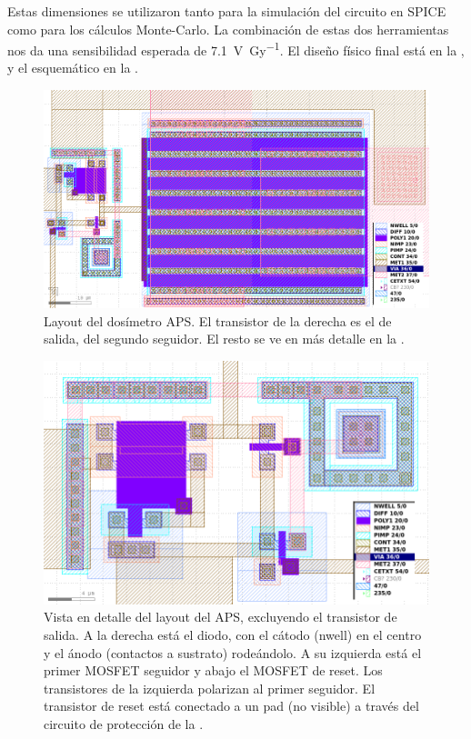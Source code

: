 Estas dimensiones se utilizaron tanto para la simulación del circuito en SPICE
como para los cálculos Monte-Carlo.
La combinación de estas dos herramientas nos da una sensibilidad esperada de 
\SI{7.1}{\volt\per\gray}.
El diseño físico final está en la ,
y el esquemático en la .
\begin{figure}[p]
    \centering
    \includegraphics[width=\columnwidth]{figuras/gds/aps/todo.png}
    \caption{Layout del dosímetro APS. 
    El transistor de la derecha es el de salida, del segundo seguidor.
    El resto se ve en más detalle en la .}
    \label{fig:layoutaps}
\end{figure}
\begin{figure}[p]
    \centering
    \includegraphics[width=\columnwidth]{figuras/gds/aps/zoom.png}
    \caption{Vista en detalle del layout del APS, excluyendo el transistor de
        salida.
        A la derecha está el diodo, con el cátodo (nwell) en el centro y el
        ánodo (contactos a sustrato) rodeándolo.
        A su izquierda está el primer MOSFET seguidor y abajo el MOSFET de
        reset.
        Los transistores de la izquierda polarizan al primer seguidor.
    El transistor de reset está conectado a un pad (no visible) a través del
    circuito de protección de la .}
    \label{fig:layoutapszoom}
\end{figure}
